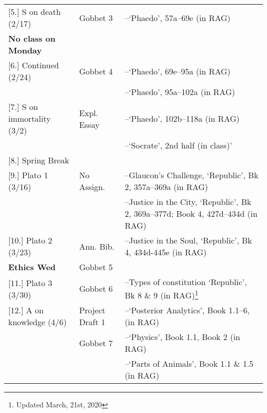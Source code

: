 \documentclass[article,oneside]{memoir}
\begin{document}
\begin{center}
\begin{longtable}{p{4.5cm}p{2cm}p{4.5cm}}
[5.] S on death  (2/17)			& Gobbet 3	    	 & --`Phaedo', 57a--69e (in RAG) \\
\textbf{No class on Monday}						 & 			      & \\ [1.8\baselineskip]  \hline %

[6.] Continued (2/24) 			& 	Gobbet 4          & --`Phaedo', 69e--95a  (in RAG)   \\
						        & 				 & --`Phaedo', 95a--102a  (in RAG) \\ [1.8\baselineskip] \hline
  
[7.] S on immortality (3/2)	  		& Expl. Essay		 & --`Phaedo', 102b--118a  (in RAG)   \\
							& 				 & --`Socrate', 2nd half (in class)' \\ [1.8\baselineskip] \hline

[8.] Spring Break				& 				 &  					\\ [1.8\baselineskip]	\hline


[9.] Plato 1 (3/16)				& No Assign.			& --Glaucon's Challenge, `Republic', Bk 2, 357a--369a (in RAG)  \\ 
							& 	        				& --Justice in the City, `Republic', Bk 2, 369a--377d; Book 4, 427d--434d (in RAG) \\ [1.8\baselineskip] \hline
				     			 


[10.] Plato 2	(3/23)			& Ann. Bib.			&   --Justice in the Soul, `Republic', Bk 4, 434d-445e (in RAG) \\
	\textbf{Ethics Wed}	            	& Gobbet 5				&   \\  [1.8\baselineskip] \hline

[11.] Plato 3	(3/30)			& Gobbet 6			& --Types of constitution `Republic', Bk 8 \& 9 (in RAG)\footnote{Updated March, 21st, 2020}  \\ [1.8\baselineskip] \hline
                                  			      

[12.] A on knowledge (4/6)			& Project Draft 1		& --`Posterior Analytics', Book 1.1--6, (in RAG) \\
						    	&  Gobbet 7			& --`Physics', Book 1.1, Book 2 (in RAG) \\
							&					& --`Parts of Animals', Book 1.1 \& 1.5 (in RAG)	 \\ [1.8\baselineskip] \hline
                                    


\end{longtable}
\end{center}
\end{document}
